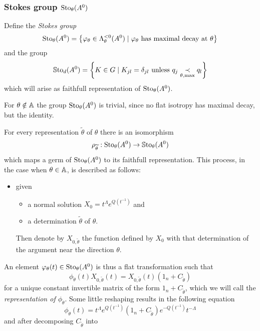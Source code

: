 \subsubsection{Stokes group $\operatorname{Sto}_\theta(A^0)$}
\begin{defn}
  Define the \emph{Stokes group}
  \[
    \operatorname{Sto}_\theta(A^0)=
    \left\{\varphi_\theta\in\Lambda_\theta^{<0}(A^0)
      \mid \varphi_\theta \text{ has maximal decay at } \theta
    \right\}
  \]
  and the group
  \[
    \operatorname{\mathbb{S}to}_d(A^0)= \left\{K\in G\mid K_{jl}=\delta_{jl} \text{ unless }
      q_j \underset{\theta,\max}{\prec} q_l \right\}
  \]
  which will arise as faithfull representation of $\operatorname{Sto}_\theta(A^0)$.
  \begin{rem}
    For $\theta\notin\mathbb{A}$ the group $\operatorname{Sto}_\theta(A^0)$ is trivial, since no flat
    isotropy has maximal decay, but the identity.
  \end{rem}
\end{defn}
For every representation $\tilde\theta$ of $\theta$ there is an isomorphism
\[
  \rho_{\widetilde\theta}:\operatorname{Sto}_\theta(A^0)\to\operatorname{\mathbb{S}to}_\theta(A^0)
\]
which maps a germ of $\operatorname{Sto}_\theta(A^0)$ to its faithfull representation. This
process, in the case when $\theta\in\mathbb{A}$, is described as follows:
\begin{itemize}
  \item[] given
    \begin{itemize}
      \item a normal solution $X_0=t^\Lambda e^{Q(t^{-1})}$ and
      \item a determination $\tilde\theta$ of $\theta$.
    \end{itemize}
    Then denote by $X_{0,\tilde\theta}$ the function defined by $X_0$ with that
    determination of the argument near the direction $\theta$.
\end{itemize}
An element $\varphi_\theta(t)\in\operatorname{Sto}_\theta(A^0)$ is thus a flat transformation
such that
\[
  \phi_\theta(t)X_{0,\tilde\theta}(t)
  =X_{0,\tilde\theta}(t)(1_n+C_{\tilde\theta})
\]
for a unique constant invertible matrix of the form $1_n+C_{\tilde\theta}$,
which we will call the \emph{representation of $\phi_\theta$}.
Some little reshaping results in the following equation
\[
  \phi_\theta(t)
  =t^\Lambda e^{Q(t^{-1})}(1_n+C_{\tilde\theta})e^{-Q(t^{-1})}t^{-\Lambda}
\]
and after decomposing  $C_{\tilde\theta}$
into 
